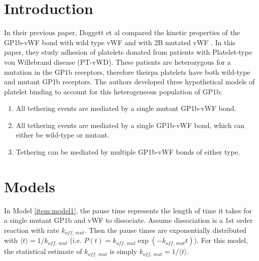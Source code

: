 \documentclass[
10pt, %
letterpaper, %
twocolumn, %
landscape %
]{article}
\newcommand{\kom}{k_\textit{off, mut}}
\begin{document}
\pagestyle{myheadings} %
\markright{\doctitle} %


\thispagestyle{plain} %

\printtitle %


\section{Introduction} 

In their previous paper, Doggett et al compared the kinetic properties
of the GP1b-vWF bond with wild type vWF and with 2B mutated vWF
\cite{doggett02slk}. 
In this paper, they study adhesion of platelets donated from patients
with Platelet-type von Willebrand disease (PT-vWD). These patients are
heterozygous for a mutation in the GP1b receptors, therefore theirpa
platelets have both wild-type and mutant GP1b receptors. The authors
developed three hypothetical models of platelet binding to account for
this heterogeneous population of GP1b:
\begin{enumerate}
\item All tethering events are mediated by a single mutant GP1b-vWF
  bond. \label{item:model1}
\item All tethering events are mediated by a single GP1b-vWF bond,
  which can either be wild-type or mutant. \label{item:model2}
\item Tethering can be mediated by multiple GP1b-vWF bonds of either
  type. \label{item:model3}
\end{enumerate}


\section{Models} 

In Model \ref{item:model1}, the pause time represents the length of
time it takes for a single mutant GP1b and vWF to dissociate. Assume
dissociation is a 1st order reaction with rate $k_\textit{off,
  mut}$. Then the pause times are exponentially distributed with
$\langle t \rangle = 1/\kom$ (i.e. $P(t) = \kom \exp(-\kom t)$). For
this model, the statistical estimate of $\kom$ is simply $\kom =
1/\langle t \rangle$. 
\end{document}

